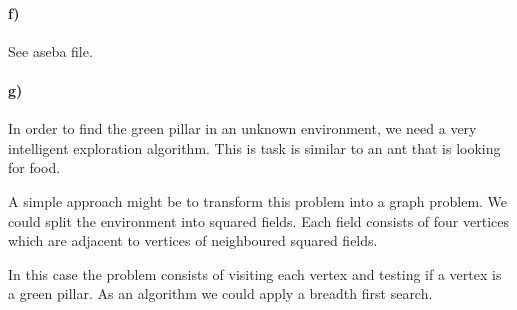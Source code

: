 \documentclass[12pt]{article}
\begin{document}
\paragraph{f)} See aseba file.

\paragraph{g)} In order to find the green pillar in an unknown environment, we need a very intelligent exploration algorithm. This is task is similar to an ant that is looking for food.

A simple approach might be to transform this problem into a graph problem.
We could split the environment into squared fields. Each field consists of four vertices which are adjacent to vertices of neighboured squared fields.

In this case the problem consists of visiting each vertex and testing if a vertex is a green pillar. As an algorithm we could apply a breadth first search.
\end{document}
